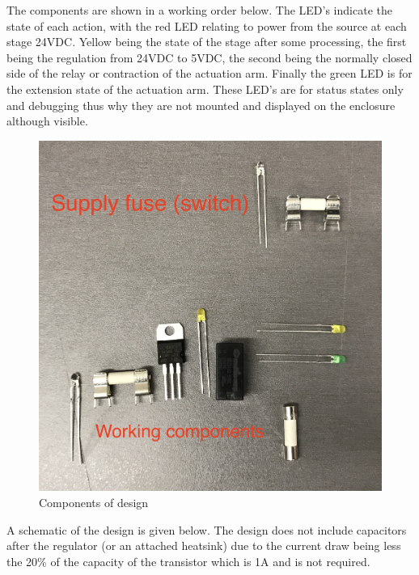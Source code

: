 \documentclass[a4paper, 10pt]{IEEEconf}
\begin{document}
The components are shown in a working order below. The LED's indicate the state of each action, with the red LED relating to power from the source at each stage 24VDC. Yellow being the state of the stage after some processing, the first being the regulation from 24VDC to 5VDC, the second being the normally closed side of the relay or contraction of the actuation arm. Finally the green LED is for the extension state of the actuation arm. These LED's are for status states only and debugging thus why they are not mounted and displayed on the enclosure although visible.

\begin{figure}[H]
  \includegraphics[width=\linewidth]{images/parts}
  \caption{Components of design}
  \label{fig:Components of design}
\end{figure}

A schematic of the design is given below. The design does not include capacitors after the regulator (or an attached heatsink) due to the current draw being less the 20\% of the capacity of the transistor which is 1A and is not required.
\end{document}
